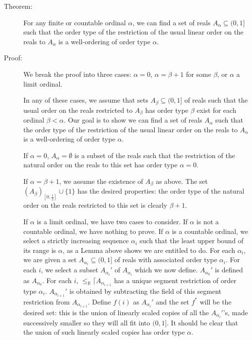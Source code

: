 \documentclass[12pt]{book}
\begin{document}
\begin{description}
\item[Theorem:] For any finite or countable ordinal $\alpha$, we can
find a set of reals $A_{\alpha}\subseteq (0,1]$ such that the order type of the
restriction of the usual linear order on the reals to $A_{\alpha}$ is
a well-ordering of order type $\alpha$.

\item[Proof:] We break the proof into three cases: $\alpha=0$, $\alpha
= \beta+1$ for some $\beta$, or $\alpha$ a limit ordinal.

In any of these cases, we assume that sets $A_{\beta}\subseteq (0,1]$ of reals such
that the usual order on the reals restricted to $A_{\beta}$ has order
type $\beta$ exist for each ordinal $\beta<\alpha$.  Our goal is to
show we can find a set of reals $A_{\alpha}$ such that the order type
of the restriction of the usual linear order on the reals to
$A_{\alpha}$ is a well-ordering of order type $\alpha$.

If $\alpha=0$, $A_{\alpha}=\emptyset$ is a subset of the reals such
that the restriction of the natural order on the reals to this set has
order type $\alpha=0$.

If $\alpha=\beta+1$, we assume the existence of $A_{\beta}$ as above.
The set $(A_{\beta})_{[0,\frac12]} \cup \{1\}$ has the desired
properties: the order type of the natural order on the reals
restricted to this set is clearly $\beta+1$.

If $\alpha$ is a limit ordinal, we have two cases to consider.  If
$\alpha$ is not a countable ordinal, we have nothing to prove.  If
$\alpha$ is a countable ordinal, we select a strictly increasing
sequence $\alpha_i$ such that the least upper bound of its range is
$\alpha$, as a Lemma above shows we are entitled to do.  For each
$\alpha_i$, we are given a set $A_{\alpha_i}\subseteq (0,1]$ of reals
with associated order type $\alpha_i$.  For each $i$, we select a
subset $A_{\alpha_i}'$ of $A_{\alpha_i}$ which we now define.
$A_{\alpha_0}'$ is defined as $A_{\alpha_0}$.  For each $i$,
$\leq_{\mathbb R}\lceil A_{\alpha_{i+1}}$ has a unique segment
restriction of order type $\alpha_i$.  $A_{\alpha_{i+1}}'$ is obtained
by subtracting the field of this segment restriction from
$A_{\alpha_{i+1}}$.  Define $f(i)$ as $A_{\alpha_{i}}'$ and the set
$f^*$ will be the desired set: this is the union of linearly scaled
copies of all the $A_{\alpha_{i}}'$'s, made successively smaller so
they will all fit into $(0,1]$. It should be clear that the union of
such linearly scaled copies has order type $\alpha$.


\end{description}
\end{document}
